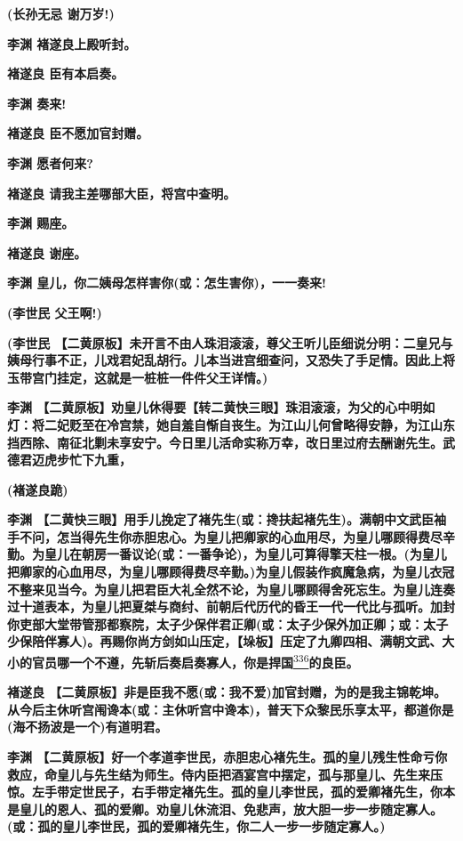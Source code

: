 \textbf{(长孙无忌 谢万岁!)}

\textbf{李渊 褚遂良上殿听封。}

\textbf{褚遂良 臣有本启奏。}

\textbf{李渊 奏来!}

\textbf{褚遂良 臣不愿加官封赠。}

\textbf{李渊 愿者何来?}

\textbf{褚遂良 请我主差哪部大臣，将宫中查明。}

\textbf{李渊 赐座。}

\textbf{褚遂良 谢座。}

\textbf{李渊 皇儿，你二姨母怎样害你(或：怎生害你)，一一奏来!}

\textbf{(李世民 父王啊!)}

\textbf{(李世民
【二黄原板】未开言不由人珠泪滚滚，尊父王听儿臣细说分明：二皇兄与姨母行事不正，儿戏君妃乱胡行。儿本当进宫细查问，又恐失了手足情。因此上将玉带宫门挂定，这就是一桩桩一件件父王详情。)}

\textbf{李渊
【二黄原板】劝皇儿休得要【转二黄快三眼】珠泪滚滚，为父的心中明如灯：将二妃贬至在冷宫禁，她自羞自惭自丧生。为江山儿何曾略得安静，为江山东挡西除、南征北剿未享安宁。今日里儿活命实称万幸，改日里过府去酬谢先生。武德君迈虎步忙下九重，}

\textbf{(褚遂良跪)}

\textbf{李渊
【二黄快三眼】用手儿挽定了褚先生(或：搀扶起褚先生)。满朝中文武臣袖手不问，怎当得先生你赤胆忠心。为皇儿把卿家的心血用尽，为皇儿哪顾得费尽辛勤。为皇儿在朝房一番议论(或：一番争论)，为皇儿可算得擎天柱一根。(为皇儿把卿家的心血用尽，为皇儿哪顾得费尽辛勤。)为皇儿假装作疯魔急病，为皇儿衣冠不整来见当今。为皇儿把君臣大礼全然不论，为皇儿哪顾得舍死忘生。为皇儿连奏过十道表本，为皇儿把夏桀与商纣、前朝后代历代的昏王一代一代比与孤听。加封你吏部大堂带管那都察院，太子少保伴君正卿(或：太子少保外加正卿；或：太子少保陪伴寡人)。再赐你尚方剑如山压定，【垛板】压定了九卿四相、满朝文武、大小的官员哪一个不遵，先斩后奏启奏寡人，你是捍国}\protect\hyperlink{fn336}{\textsuperscript{336}}\textbf{的良臣。}

\textbf{褚遂良
【二黄原板】非是臣我不愿(或：我不爱)加官封赠，为的是我主锦乾坤。从今后主休听宫闱谗本(或：主休听宫中谗本)，普天下众黎民乐享太平，都道你是(海不扬波是一个)有道明君。}

\textbf{李渊
【二黄原板】好一个孝道李世民，赤胆忠心褚先生。孤的皇儿残生性命亏你救应，命皇儿与先生结为师生。侍内臣把酒宴宫中摆定，孤与那皇儿、先生来压惊。左手带定世民子，右手带定褚先生。孤的皇儿李世民，孤的爱卿褚先生，你本是皇儿的恩人、孤的爱卿。劝皇儿休流泪、免悲声，放大胆一步一步随定寡人。(或：孤的皇儿李世民，孤的爱卿褚先生，你二人一步一步随定寡人。)}

